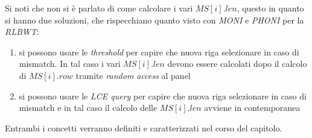 Si noti che non si è parlato di come calcolare i vari $MS[i].len$, questo in
quanto si hanno due soluzioni, che rispecchiano quanto visto con
\textit{MONI}\cite{moni} e \textit{PHONI} \cite{phoni} per la \textit{RLBWT}: 
\begin{enumerate}
  \item si possono usare le \textit{threshold} per capire che nuova riga
  selezionare in 
  caso di mismatch. In tal caso i vari $MS[i].len$ devono essere calcolati dopo
  il calcolo di $MS[i].row$ tramite \textit{random access} al panel
  \item si possono usare le \textit{LCE query} per capire che nuova riga
  selezionare in caso di mismatch e in tal caso il calcolo delle $MS[i].len$
  avviene in contemporanea 
\end{enumerate}
Entrambi i concetti verranno definiti e caratterizzati nel corso del capitolo.
